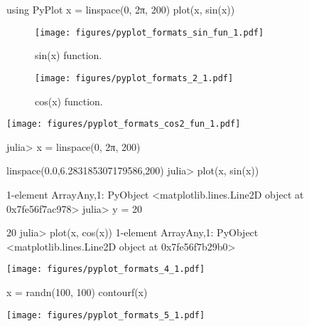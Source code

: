



\begin{juliacode}
using PyPlot
x = linspace(0, 2π, 200)
plot(x, sin(x))
\end{juliacode}
\begin{figure}[ht]
\center
\texttt{[image: figures/pyplot\_formats\_sin\_fun\_1.pdf]}
\caption{sin(x) function.}
\label{fig:sin_fun}
\end{figure}



\begin{figure}[htpb]
\center
\texttt{[image: figures/pyplot\_formats\_2\_1.pdf]}
\caption{cos(x) function.}
\end{figure}



\texttt{[image: figures/pyplot\_formats\_cos2\_fun\_1.pdf]}



\begin{juliaterm}
julia> x = linspace(0, 2π, 200)

linspace(0.0,6.283185307179586,200)
julia> plot(x, sin(x))

1-element Array{Any,1}:
 PyObject <matplotlib.lines.Line2D object at 0x7fe56f7ac978>
julia> y = 20

20
julia> plot(x, cos(x))
1-element Array{Any,1}:
 PyObject <matplotlib.lines.Line2D object at 0x7fe56f7b29b0>
\end{juliaterm}
\texttt{[image: figures/pyplot\_formats\_4\_1.pdf]}



\begin{juliacode}
x = randn(100, 100)
contourf(x)
\end{juliacode}
\texttt{[image: figures/pyplot\_formats\_5\_1.pdf]}
